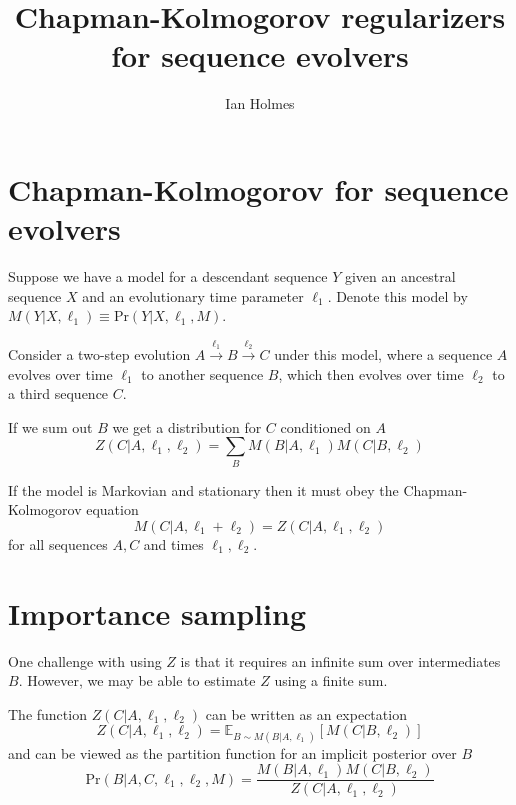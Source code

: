 \documentclass{article}
\title{Chapman-Kolmogorov regularizers for sequence evolvers}
\author{Ian Holmes}
\newcommand\prob[1]{\mbox{Pr}\left( #1 \right)}
\newcommand\expect{\mathbb{E}}
\newcommand\eqnlabel[1]{\label{eq:#1}}
\newcommand\seclabel[1]{\label{sec:#1}}
\begin{document}
\maketitle



\section{Chapman-Kolmogorov for sequence evolvers}
\seclabel{ChapmanKolmogorov}

Suppose we have a model for a descendant sequence $Y$ given an ancestral sequence $X$ and an evolutionary time parameter $\ell_1$.
Denote this model by $M(Y|X,\ell_1) \equiv \prob{Y|X,\ell_1,M}$.

Consider a two-step evolution $A \xrightarrow{\ell_1} B \xrightarrow{\ell_2} C$
under this model, where a sequence $A$ evolves over time $\ell_1$
to another sequence $B$, which then evolves over time $\ell_2$ to a third sequence $C$.

If we sum out $B$ we get a distribution for $C$ conditioned on $A$
\[
Z(C|A,\ell_1,\ell_2) = \sum_B M(B|A,\ell_1) M(C|B,\ell_2)
\]

If the model is Markovian and stationary then it must obey the Chapman-Kolmogorov equation
\begin{equation}
M(C|A,\ell_1+\ell_2) = Z(C|A,\ell_1,\ell_2)
\eqnlabel{ChapmanKolmogorov}
\end{equation}
for all sequences $A,C$ and times $\ell_1,\ell_2$.

\section{Importance sampling}
\seclabel{ImportanceSample}

One challenge with using $Z$ is that it requires an infinite sum over intermediates $B$.
However, we may be able to estimate $Z$ using a finite sum.

The function $Z(C|A,\ell_1,\ell_2)$ can be written as an expectation
\[
Z(C|A,\ell_1,\ell_2) = \expect_{B \sim M(B|A,\ell_1)} \left[ M(C|B,\ell_2) \right]
\]
and can be viewed as the partition function for an implicit posterior over $B$
\[
\prob{B|A,C,\ell_1,\ell_2,M} = \frac{M(B|A,\ell_1) M(C|B,\ell_2)}{Z(C|A,\ell_1,\ell_2)}
\]
\end{document}
